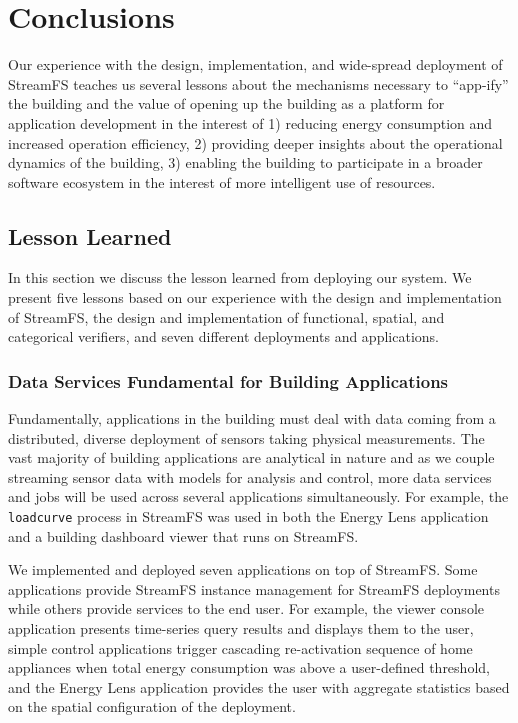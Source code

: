 
\chapter{Conclusions}
\label{chap:future}

Our experience with the design, implementation, and wide-spread deployment of StreamFS teaches us several lessons about
the mechanisms necessary to ``app-ify'' the building and the value of opening up the building as a platform for application 
development in the interest of 1) reducing energy consumption and increased operation efficiency, 2) providing deeper
insights about the operational dynamics of the building, 3) enabling the building to participate in a broader
software ecosystem in the interest of more intelligent use of resources. 

\section{Lesson Learned}
In this section we discuss the lesson learned from deploying our system.  We present five lessons based on our
experience with the design and implementation of StreamFS, the design and implementation of functional, spatial,
and categorical verifiers, and seven different deployments and applications.



\subsection{Data Services Fundamental for Building Applications}
Fundamentally, applications in the building must deal with data coming from a distributed, diverse deployment of sensors
taking physical measurements.  The vast majority of building applications are analytical in nature and as we couple
streaming sensor data with models for analysis and control, more data services and jobs will be used across 
several applications simultaneously.  For example, the \texttt{loadcurve} process in StreamFS was used in both 
the Energy Lens application and a building dashboard viewer that runs on StreamFS.

We implemented and deployed seven applications on top of StreamFS.  Some applications provide StreamFS instance management 
for StreamFS deployments while others provide services to the end user.  For example, the viewer console application
 presents time-series query results 
and displays them to the user, simple control applications trigger cascading re-activation sequence of home appliances when total energy consumption
was above a user-defined threshold, and the Energy Lens application provides the user with aggregate statistics based on
the spatial configuration of the deployment.

